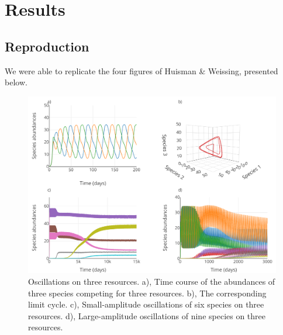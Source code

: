 \section{Results}

\subsection{Reproduction}

We were able to replicate the four figures of Huisman \& Weissing\cite{1999:Huisman}, presented below. 

\begin{figure}[H]
\begin{center} 
 \includegraphics[width=1\textwidth]{../Code/Figures/Figure_1.pdf}
  \caption{Oscillations on three resources. a), Time course of the abundances 
of three species competing for three resources. b), The corresponding limit 
cycle. c), Small-amplitude oscillations of six species on three resources. 
d), Large-amplitude oscillations of nine species on three resources.}
  \label{figures:Fig1}
\end{center}
\end{figure}

